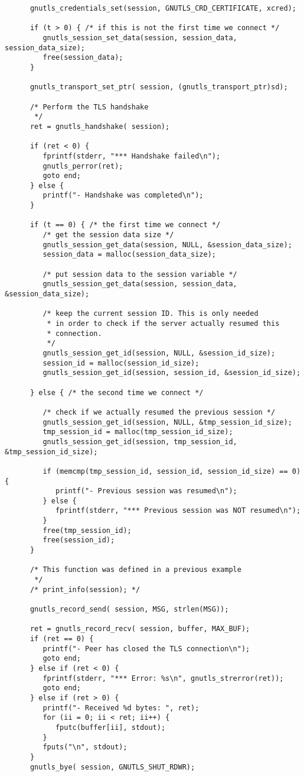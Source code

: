 \begin{verbatim}
      gnutls_credentials_set(session, GNUTLS_CRD_CERTIFICATE, xcred);

      if (t > 0) { /* if this is not the first time we connect */
         gnutls_session_set_data(session, session_data, session_data_size);
         free(session_data);
      }
      
      gnutls_transport_set_ptr( session, (gnutls_transport_ptr)sd);

      /* Perform the TLS handshake
       */
      ret = gnutls_handshake( session);

      if (ret < 0) {
         fprintf(stderr, "*** Handshake failed\n");
         gnutls_perror(ret);
         goto end;
      } else {
         printf("- Handshake was completed\n");
      }

      if (t == 0) { /* the first time we connect */
         /* get the session data size */
         gnutls_session_get_data(session, NULL, &session_data_size);
         session_data = malloc(session_data_size);

         /* put session data to the session variable */
         gnutls_session_get_data(session, session_data, &session_data_size);

         /* keep the current session ID. This is only needed
          * in order to check if the server actually resumed this
          * connection.
          */
         gnutls_session_get_id(session, NULL, &session_id_size);
         session_id = malloc(session_id_size);
         gnutls_session_get_id(session, session_id, &session_id_size);

      } else { /* the second time we connect */

         /* check if we actually resumed the previous session */
         gnutls_session_get_id(session, NULL, &tmp_session_id_size);
         tmp_session_id = malloc(tmp_session_id_size);
         gnutls_session_get_id(session, tmp_session_id, &tmp_session_id_size);

         if (memcmp(tmp_session_id, session_id, session_id_size) == 0) {
            printf("- Previous session was resumed\n");
         } else {
            fprintf(stderr, "*** Previous session was NOT resumed\n");
         }
         free(tmp_session_id);
         free(session_id);
      }

      /* This function was defined in a previous example
       */
      /* print_info(session); */

      gnutls_record_send( session, MSG, strlen(MSG));

      ret = gnutls_record_recv( session, buffer, MAX_BUF);
      if (ret == 0) {
         printf("- Peer has closed the TLS connection\n");
         goto end;
      } else if (ret < 0) {
         fprintf(stderr, "*** Error: %s\n", gnutls_strerror(ret));
         goto end;
      } else if (ret > 0) {
         printf("- Received %d bytes: ", ret);
         for (ii = 0; ii < ret; ii++) {
            fputc(buffer[ii], stdout);
         }
         fputs("\n", stdout);
      }
      gnutls_bye( session, GNUTLS_SHUT_RDWR);


\end{verbatim}
